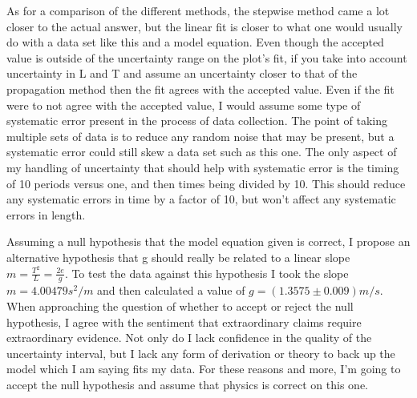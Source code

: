 \documentclass[twocolumn,11pt]{article}
\begin{document}
As for a comparison of the different methods, the stepwise method came a lot closer to the actual answer, but the linear fit is closer to what one would usually do with a data set like this and a model equation. Even though the accepted value is outside of the uncertainty range on the plot's fit, if you take into account uncertainty in L and T and assume an uncertainty closer to that of the propagation method then the fit agrees with the accepted value. Even if the fit were to not agree with the accepted value, I would assume some type of systematic error present in the process of data collection. The point of taking multiple sets of data is to reduce any random noise that may be present, but a systematic error could still skew a data set such as this one. The only aspect of my handling of uncertainty that should help with systematic error is the timing of 10 periods versus one, and then times being divided by 10. This should reduce any systematic errors in time by a factor of 10, but won't affect any systematic errors in length. 

Assuming a null hypothesis that the model equation given is correct, I propose an alternative hypothesis that g should really be related to a linear slope $m=\frac{T^2}{L}=\frac{2e}{g}$. To test the data against this hypothesis I took the slope $m=4.00479 s^2/m$ and then calculated a value of $g=(1.3575 \pm 0.009) m/s$. When approaching the question of whether to accept or reject the null hypothesis, I agree with the sentiment that extraordinary claims require extraordinary evidence. Not only do I lack confidence in the quality of the uncertainty interval, but I lack any form of derivation or theory to back up the model which I am saying fits my data. For these reasons and more, I'm going to accept the null hypothesis and assume that physics is correct on this one.
\end{document}
